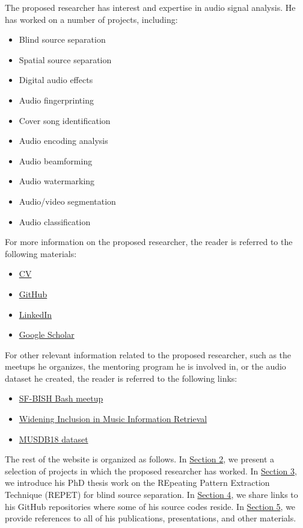 \documentclass{article}
\begin{document}
The proposed researcher has interest and expertise in audio signal analysis. He has worked on a number of projects, including:
\begin{itemize}[noitemsep,topsep=0pt]
\item Blind source separation
\item Spatial source separation
\item Digital audio effects
\item Audio fingerprinting
\item Cover song identification
\item Audio encoding analysis
\item Audio beamforming
\item Audio watermarking
\item Audio/video segmentation
\item Audio classification
\end{itemize}

For more information on the proposed researcher, the reader is referred to the following materials:
\begin{itemize}[noitemsep,topsep=0pt]
\item \href{http://zafarrafii.com/Zafar Rafii - CV.pdf}{CV}
\item \href{https://github.com/zafarrafii}{GitHub}
\item \href{https://www.linkedin.com/in/zafarrafii/}{LinkedIn}
\item \href{https://scholar.google.com/citations?user=8wbS2EsAAAAJ&hl=en}{Google Scholar}
\end{itemize}

For other relevant information related to the proposed researcher, such as the meetups he organizes, the mentoring program he is involved in, or the audio dataset he created, the reader is referred to the following links:
\begin{itemize}[noitemsep,topsep=0pt]
\item \href{https://www.meetup.com/bishbash/}{SF-BISH Bash meetup}
\item \href{https://wimir.wordpress.com/}{Widening Inclusion in Music Information Retrieval}
\item \href{https://sigsep.github.io/datasets/musdb.html#musdb18-compressed-stems}{MUSDB18 dataset}
\end{itemize}

The rest of the website is organized as follows. In \hyperref[sec:research]{Section 2}, we present a selection of projects in which the proposed researcher has worked. In \hyperref[sec:repet]{Section 3}, we introduce his PhD thesis work on the REpeating Pattern Extraction Technique (REPET) for blind source separation. In \hyperref[sec:codes]{Section 4}, we share links to his GitHub repositories where some of his source codes reside. In \hyperref[sec:refs]{Section 5}, we provide references to all of his publications, presentations, and other materials.
\end{document}

